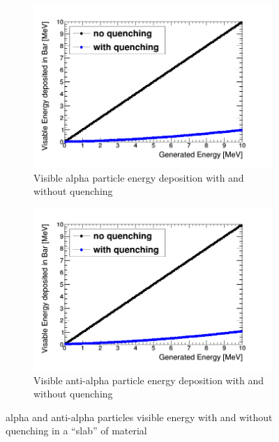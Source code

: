 \begin{figure}[htbp]
\centering
\begin{subfigure}{.5\textwidth}
  \centering
  \includegraphics[width=\linewidth]{quench_eng_Alpha.png}
  \captionsetup{width=.9\linewidth}
  \caption{Visible alpha particle energy deposition with and without quenching}
  \label{subFig:alpha_quenched_and_not}
\end{subfigure}%
\begin{subfigure}{.5\textwidth}
  \centering
  \includegraphics[width=\linewidth]{quench_eng_AAlpha.png}
  \captionsetup{width=.9\linewidth}
  \caption{Visible anti-alpha particle energy deposition with and without quenching}
  \label{subFig:Aalpha_quenched_and_not}
\end{subfigure}
\caption{alpha and anti-alpha particles visible energy with and without quenching in a ``slab'' of material}
\label{fig:alpha_Aalpha_quenched_and_not}
\end{figure}

